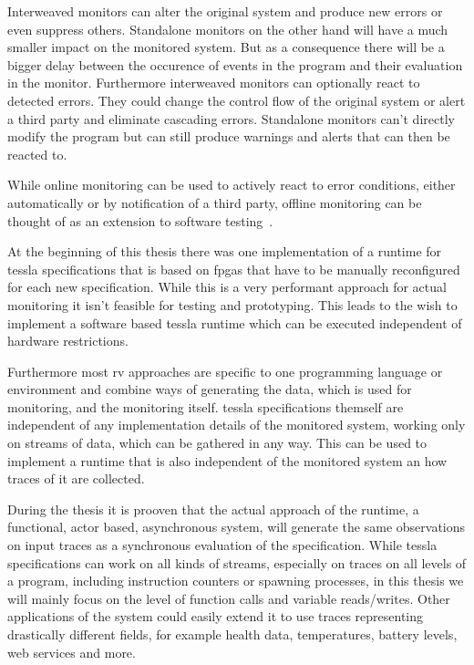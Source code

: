 Interweaved monitors can alter the original system and produce new errors or even suppress others.
Standalone monitors on the other hand will have a much smaller impact on the monitored system.
But as a consequence there will be a bigger delay between the occurence of events in the program and their evaluation in the monitor.
Furthermore interweaved monitors can optionally react to detected errors.
They could change the control flow of the original system or alert a third party and eliminate cascading errors.
Standalone monitors can't directly modify the program but can still produce warnings and alerts that can then be reacted to.

While online monitoring can be used to actively react to error conditions, either automatically or by notification of a third party, offline monitoring can be thought of as an extension to software testing~\cite{DAngelo2005}.

At the beginning of this thesis there was one implementation of a runtime for \gls{tessla} specifications that is based on \glspl{fpga} that have to be manually reconfigured for each new specification.
While this is a very performant approach for actual monitoring it isn't feasible for testing and prototyping.
This leads to the wish to implement a software based \gls{tessla} runtime which can be executed independent of hardware restrictions.

Furthermore most \gls{rv} approaches are specific to one programming language or environment and combine ways of generating the data, which is used for monitoring, and the monitoring itself.
\gls{tessla} specifications themself are independent of any implementation details of the monitored system, working only on streams of data, which can be gathered in any way.
This can be used to implement a runtime that is also independent of the monitored system an how traces of it are collected.

During the thesis it is prooven that the actual approach of the runtime, a functional, actor based, asynchronous system, will generate the same observations on input traces as a synchronous evaluation of the specification.
While \gls{tessla} specifications can work on all kinds of streams, especially on traces on all levels of a program, including instruction counters or spawning processes, in this thesis we will mainly focus on the level of function calls and variable reads/writes.
Other applications of the system could easily extend it to use traces representing drastically different fields, for example health data, temperatures, battery levels, web services and more.

